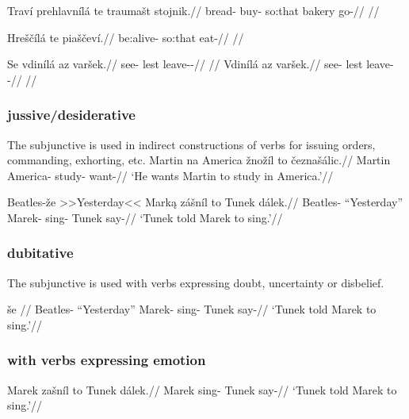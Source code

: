\pex
\begingl
\gla Traví prehlavnílá te traumašt stojnik.//
\glb bread-\Gen{} buy- {so:that} bakery go-//
\glft {}//
\endgl
\xe

\pex
\begingl
\gla Hreščílá te piaščeví.//
\glb be:alive- {so:that} eat-//
\glft {}//
\endgl
\xe

\pex
\a
\begingl
\gla Se vdinílá az varšek.//
\glb \Refl{} see- {lest} leave-\Av{}-\Pf{}//
\glft {}//
\endgl
\a
\begingl
\gla Vdinílá az varšek.//
\glb see- {lest} leave-\Av{}-\Pf{}//
\glft {}//
\endgl
\xe



\subsubsection{jussive/desiderative}
\par The subjunctive is used in indirect constructions of verbs for issuing orders, commanding, exhorting, etc.
\pex
\begingl
\gla Martin na America žnožíl to čeznašálic.//
\glb Martin \Loc{} America-\Pat{} study-  want-//
\glft `He wants Martin to study in America.'//
\endgl
\xe

\pex
\begingl
\gla Beatles-že >>Yesterday<< Mark\k{a} zášníl to Tunek dálek.//
\glb Beatles-\Gen{} ``Yesterday'' Marek-\Agt{} sing-  Tunek say-//
\glft `Tunek told Marek to sing.'//
\endgl
\xe

\subsubsection{dubitative}
\par The subjunctive is used with verbs expressing doubt, uncertainty or disbelief.

\pex
\begingl
\gla še //
\glb Beatles-\Gen{} ``Yesterday'' Marek-\Agt{} sing-  Tunek say-//
\glft `Tunek told Marek to sing.'//
\endgl
\xe

\subsubsection{with verbs expressing emotion}

\pex
\begingl
\gla Marek zašníl to Tunek dálek.//
\glb Marek sing-  Tunek say-//
\glft `Tunek told Marek to sing.'//
\endgl
\xe


